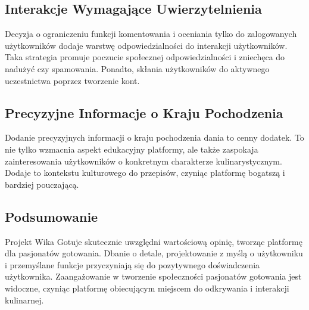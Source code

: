 \documentclass{article}
\begin{document}
\subsection{Interakcje Wymagające Uwierzytelnienia}
    Decyzja o ograniczeniu funkcji komentowania i oceniania tylko do zalogowanych użytkowników dodaje warstwę odpowiedzialności do interakcji użytkowników. Taka strategia promuje poczucie społecznej odpowiedzialności i zniechęca do nadużyć czy spamowania. Ponadto, skłania użytkowników do aktywnego uczestnictwa poprzez tworzenie kont.
\subsection{Precyzyjne Informacje o Kraju Pochodzenia}
    Dodanie precyzyjnych informacji o kraju pochodzenia dania to cenny dodatek. To nie tylko wzmacnia aspekt edukacyjny platformy, ale także zaspokaja zainteresowania użytkowników o konkretnym charakterze kulinarystycznym. Dodaje to kontekstu kulturowego do przepisów, czyniąc platformę bogatszą i bardziej pouczającą.
\subsection{Podsumowanie}
    Projekt Wika Gotuje skutecznie uwzględni wartościową opinię, tworząc platformę dla pasjonatów gotowania. Dbanie o detale, projektowanie z myślą o użytkowniku i przemyślane funkcje przyczyniają się do pozytywnego doświadczenia użytkownika. Zaangażowanie w tworzenie społeczności pasjonatów gotowania jest widoczne, czyniąc platformę obiecującym miejscem do odkrywania i interakcji kulinarnej.
\end{document}
